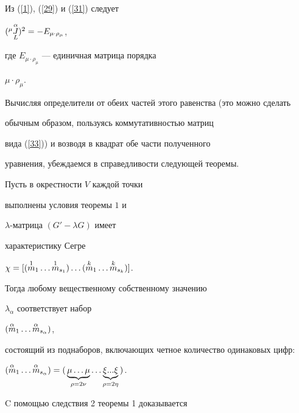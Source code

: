 Из (\ref{1}), (\ref{29}) и (\ref{31}) следует


$({{}^\mu\overset{\alpha}{\underset{L}{J}}})^2=-E_{\mu\cdot\rho_{\mu}}$,


где $E_{\mu\cdot\rho_{\mu}}$ --- единичная матрица порядка


$\mu\cdot\rho_{\mu}$.


Вычисляя определители от обеих частей этого равенства (это можно сделать


обычным образом, пользуясь коммутативностью матриц


вида (\ref{33})) и возводя в квадрат обе части полученного


уравнения, убеждаемся в справедливости следующей теоремы.





\begin{thm}


Пусть в окрестности $V$ каждой точки


выполнены условия теоремы $1$ и


$\lambda$-матрица $(G'-\lambda G)$ имеет


характеристику Сегре


$\chi =[(\up{1}{m}_1\dotsc \up{1}{m}_{s_1})\dotsc


(\up{k}{m}_1\dotsc \up{k}{m}_{s_k})]$.


Тогда любому вещественному собственному значению


$\lambda_\alpha$ соответствует набор


$(\overset{\alpha}{m}_1\dotsc\overset{\alpha}{m}_{s_{\alpha}})$,


состоящий из поднаборов, включающих четное количество одинаковых цифр$:$


$(\up{\alpha}{m}_1\dotsc\up{\alpha}{m}_{s_{\alpha}})=


(\,\underbrace{\mu \dotsc\mu}_{\rho =2\nu}\dotsc


\underbrace{\xi ...\xi}_{\rho=2\eta}\,)$.


\end{thm}





C помощью следствия 2 теоремы 1 доказывается





